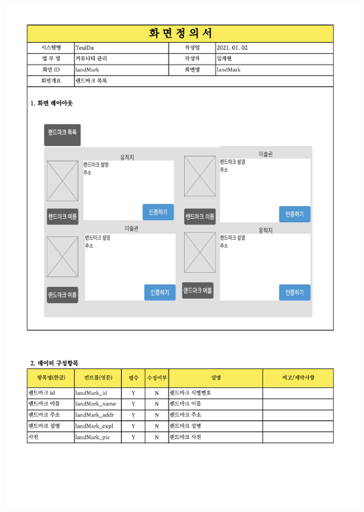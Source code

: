 {{{{{{{{{{{{{{{{{{{{{{{{{{{{{{{{{{{{{{{{{{{{{{{{{{{{{{{{{{\includegraphics[width=20cm]{./Figure/Analysis/Display/community/community_17.pdf} \\
}}}}}}}}}}}}}}}}}}}}}}}}}}}}}}}}}}}}}}}}}}}}}}}}}}}}}}}}}}
